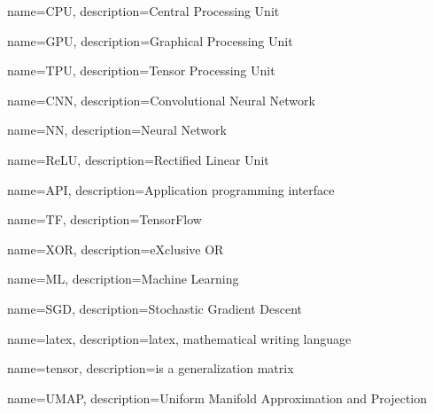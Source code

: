 {
    name=CPU,
    description={Central Processing Unit}
}

{
    name=GPU,
    description={Graphical Processing Unit}
}

{
    name=TPU,
    description={Tensor Processing Unit}
}

{
    name=CNN,
    description={Convolutional Neural Network}
}

{
    name=NN,
    description={Neural Network}
}

{
    name=ReLU,
    description={Rectified Linear Unit}
}

{
    name=API,
    description={Application programming interface}
}

{
    name=TF,
    description={TensorFlow}
}

{
    name=XOR,
    description={eXclusive OR}
}

{
    name=ML,
    description={Machine Learning}
}

{
    name=SGD,
    description={Stochastic Gradient Descent}
}

{
    name=latex,
    description={latex, mathematical writing language}
}

{
    name=tensor,
    description={is a generalization matrix}
}

{
    name=UMAP,
    description={Uniform Manifold Approximation and Projection}
}